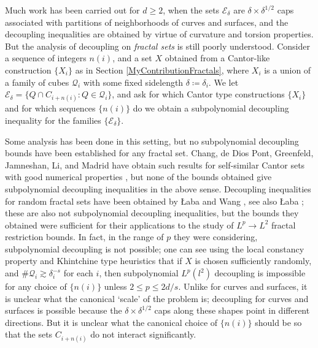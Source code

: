 \documentclass[11pt]{article}
\begin{document}
Much work has been carried out for $d \geq 2$, when the sets $\mathcal{E}_\delta$ are $\delta \times \delta^{1/2}$ caps associated with partitions of neighborhoods of curves and surfaces, and the decoupling inequalities are obtained by virtue of curvature and torsion properties. But the analysis of decoupling on \emph{fractal sets} is still poorly understood. Consider a sequence of integers $n(i)$, and a set $X$ obtained from a Cantor-like construction $\{ X_i \}$ as in Section \ref{MyContributionFractals}, where $X_i$ is a union of a family of cubes $\mathcal{Q}_i$ with some fixed sidelength $\delta \coloneqq \delta_i$. We let $\mathcal{E}_\delta = \{ Q \cap C_{i + n(i)} : Q \in \mathcal{Q}_i \}$, and ask for which Cantor type constructions $\{ X_i \}$ and for which sequences $\{ n(i) \}$ do we obtain a subpolynomial decoupling inequality for the families $\{ \mathcal{E}_\delta \}$.

Some analysis has been done in this setting, but no subpolynomial decoupling bounds have been established for any fractal set. Chang, de Dios Pont, Greenfeld, Jamneshan, Li, and Madrid have obtain such results for self-similar Cantor sets with good numerical properties \cite{ChangJaumeGreenfeldJamneshanLiMadrid}, but none of the bounds obtained give subpolynomial decoupling inequalities in the above sense. Decoupling inequalities for random fractal sets have been obtained by {\L}aba and Wang \cite{LabaWang}, see also {\L}aba \cite{Laba2}; these are also not subpolynomial decoupling inequalities, but the bounds they obtained were sufficient for their applications to the study of $L^p \to L^2$ fractal restriction bounds. In fact, in the range of $p$ they were considering, subpolynomial decoupling is not possible; one can see using the local constancy property and Khintchine type heuristics that if $X$ is chosen sufficiently randomly, and $\# \mathcal{Q}_i \gtrsim \delta_i^{-s}$ for each $i$, then subpolynomial $L^p(l^2)$ decoupling is impossible for any choice of $\{ n(i) \}$ unless $2 \leq p \leq 2d/s$. Unlike for curves and surfaces, it is unclear what the canonical `scale' of the problem is; decoupling for curves and surfaces is possible because the $\delta \times \delta^{1/2}$ caps along these shapes point in different directions. But it is unclear what the canonical choice of $\{ n(i) \}$ should be so that the sets $C_{i + n(i)}$ do not interact significantly.
\end{document}
